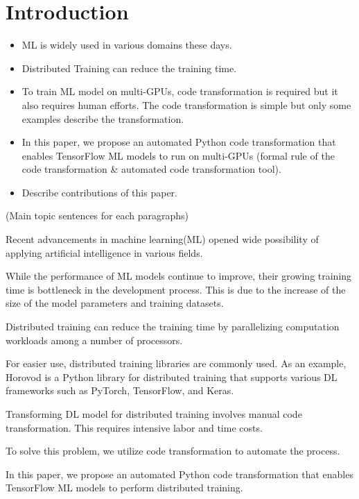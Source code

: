 \section{Introduction}\label{sec:intro}
\begin{itemize}
  \item ML is widely used in various domains these days.
  \item Distributed Training can reduce the training time.
  \item To train ML model on multi-GPUs, code transformation is required but it
    also requires human efforts. The code transformation is simple but only
    some examples describe the transformation.
  \item In this paper, we propose an automated Python code transformation that
    enables TensorFlow ML models to run on multi-GPUs (formal rule of the code
    transformation \& automated code transformation tool).
  \item Describe contributions of this paper.
\end{itemize}

(Main topic sentences for each paragraphs)

Recent advancements in machine learning(ML) opened wide possibility of
applying artificial intelligence in various fields.

While the performance of ML models continue to improve,
their growing training time is bottleneck in the development process.
This is due to the increase of the size of the model parameters 
and training datasets.

Distributed training can reduce the training time 
by parallelizing computation workloads among a number of processors. 

For easier use, distributed training libraries are commonly used.
As an example, Horovod is a Python library for distributed training that
supports various DL frameworks such as PyTorch, TensorFlow, and Keras. 

Transforming DL model for distributed training involves
manual code transformation. This requires intensive labor and time costs.

To solve this problem, we utilize code transformation to automate the process.

In this paper, we propose an automated Python code transformation that enables
TensorFlow ML models to perform distributed training.

